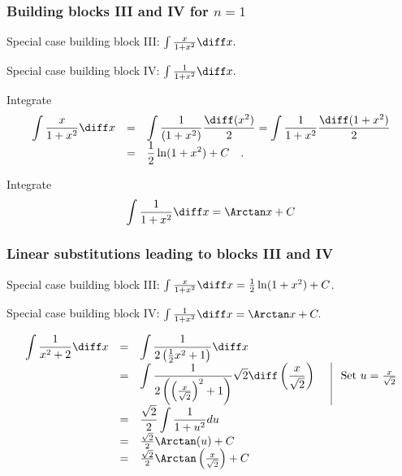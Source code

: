 \begin{frame}
\frametitle{Building blocks III and IV for $n=1$}
Special case building block III: $\int \frac{x}{1+x^2}\diff x.$

Special case building block IV: $\int \frac{1}{1+x^2 }\diff x.$
\begin{example}
Integrate 
\[
\begin{array}{rcl}
\displaystyle \int \frac{x}{1+x^2 }\diff x &=&\displaystyle \int \frac{1}{(1+x^2) }\frac{\diff (x^2)}{2} = \int \frac{1}{1+x^2 }\frac{\diff (1+x^2)}{2} \\
&=&\displaystyle\frac12\ln (1+x^2)+C\quad .
\end{array}
\]
\end{example}
\begin{example}
Integrate 
\[
\displaystyle \int \frac{1}{1+x^2 }\diff x =\Arctan x +C
\]
\end{example}
\vspace{2cm} 
\end{frame}
\begin{frame}
\frametitle{Linear substitutions leading to blocks III and IV}
Special case building block III: $ \int \frac{x}{1+x^2}\diff x = \frac{1}{2}\ln(1+x^2)+C$.

Special case building block IV: $ \int \frac{1}{1+x^2 }\diff x=\Arctan x+C.$


\begin{example}
\[
\begin{array}{rcll|l}
\displaystyle \int \frac{1}{x^2+2}\diff x&=&\displaystyle \int\frac{1}{2 \left(\frac{1}{2}x^2+1\right)}\diff x \\
&=&\displaystyle \int \frac{1}{2\left(\left(\frac{x}{\sqrt{2}}\right)^2+1  \right)} \sqrt{2}\diff\left(\frac{ x}{\sqrt{2}}\right) &&\text{ Set } u=\frac{x}{\sqrt{2}} \\
&=&\displaystyle \frac{\sqrt{2}}{2}\int \frac{1}{1+u^2}du\\
&=&\frac{\sqrt{2}}{2}\Arctan (u)+C \\&=&\frac{\sqrt{2}}{2} \Arctan\left(\frac{x}{\sqrt{2}}\right)+C
\end{array}
\]

\end{example}
\vspace{2cm}

\end{frame}

